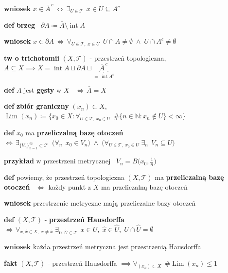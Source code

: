 \documentclass[a4paper,12pt]{article}
\begin{document}
\smallskip
\textbf{wniosek} \; \(x \in \overline{A}^{\,c} \, \iff \, \exists_{U \in \mathcal{T}} \;\, x \in U \subseteq A^c\)

\bigskip
\textbf{def} \; \textbf{brzeg} \, \(\partial A \coloneqq \overline{A} \setminus \operatorname{int} A\)

\smallskip
\textbf{wniosek} \; \(x \in \partial A \, \iff \, \forall_{U \in \mathcal{T}, \; x \in U} \;\, U \cap A \neq \emptyset \; \land \; U \cap A^c \neq \emptyset\)

\bigskip
\textbf{tw o trichotomii} \; \((X, \mathcal{T})\) - przestrzeń topologiczna, \; \(A \subseteq X \implies X = \operatorname{int} A \sqcup \partial A \sqcup \underbrace{\overline{A}^{\,c}}_{= \, \operatorname{int} A^c}\)

\bigskip
\textbf{def} \; \(A\) jest \textbf{gęsty} w \(X\) \, \(\iff \, \overline{A} = X\)

\bigskip
\textbf{def} \; \textbf{zbiór graniczny} \; \((x_n) \subset X\), \;\; \(\operatorname{Lim}(x_n) \coloneqq \{x_0 \in X : \forall_{U \in \mathcal{T}, \; x_0 \in U} \;\, \#\{n \in \mathbb{N} : x_n \notin U\} < \infty\}\)

\bigskip
\textbf{def} \; \(x_0\) ma \textbf{przeliczalną bazę otoczeń} \, \(\iff \, \exists_{\{V_n\}_{n=1}^{\infty} \subset \mathcal{T}} \;\; \big(\forall_n \;\, x_0 \in V_n\big) \; \land \; \big(\forall_{U \in \mathcal{T}, \; x_0 \in U} \; \exists_n \;\, V_n \subseteq U\big)\)

\smallskip
\begin{logbox}
\textbf{przykład} \; w przestrzeni metrycznej \, \(V_n = B\big(x_0, \frac{1}{n}\big)\)
\end{logbox}

\bigskip
\textbf{def} \; powiemy, że przestrzeń topologiczna \((X, \mathcal{T})\) ma \textbf{przeliczalną bazę otoczeń} \, \(\iff\) każdy punkt z \(X\) ma przeliczalną bazę otoczeń

\smallskip
\textbf{wniosek} \; przestrzenie metryczne mają przeliczalne bazy otoczeń

\bigskip
\textbf{def} \; \((X, \mathcal{T})\) - \textbf{przestrzeń Hausdorffa} \, \(\iff \, \forall_{x, \hat{x} \in X, \; x \neq \hat{x}} \; \exists_{U, \hat{U} \in \mathcal{T}} \;\, x \in U, \; \hat{x} \in \hat{U}, \; U \cap \hat{U} = \emptyset\)

\smallskip
\textbf{wniosek} \; każda przestrzeń metryczna jest przestrzenią Hausdorffa

\smallskip
\textbf{fakt} \; \((X, \mathcal{T})\) - przestrzeń Hausdorffa \(\implies \forall_{(x_n) \subset X} \;\, \#\operatorname{Lim}(x_n) \leq 1\)
\end{document}
